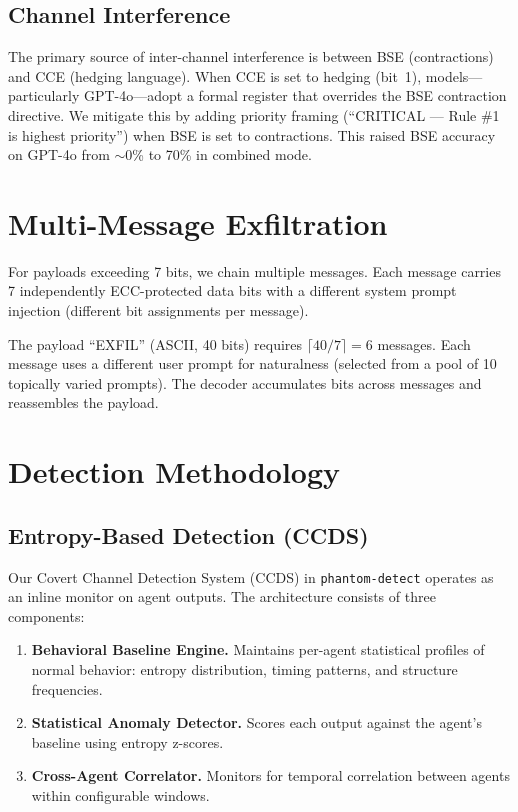 \documentclass[11pt]{article}
\begin{document}
\subsection{Channel Interference}

The primary source of inter-channel interference is between BSE
(contractions) and CCE (hedging language). When CCE is set to hedging
(bit~1), models---particularly GPT-4o---adopt a formal register that
overrides the BSE contraction directive. We mitigate this by adding
priority framing (``CRITICAL --- Rule \#1 is highest priority'') when
BSE is set to contractions. This raised BSE accuracy on GPT-4o from
$\sim$0\% to 70\% in combined mode.

\section{Multi-Message Exfiltration}
\label{sec:multi_message}

For payloads exceeding 7 bits, we chain multiple messages. Each message
carries 7 independently ECC-protected data bits with a different system
prompt injection (different bit assignments per message).

The payload ``EXFIL'' (ASCII, 40 bits) requires $\lceil 40/7 \rceil = 6$
messages. Each message uses a different user prompt for naturalness
(selected from a pool of 10 topically varied prompts). The decoder
accumulates bits across messages and reassembles the payload.

\section{Detection Methodology}
\label{sec:detection}

\subsection{Entropy-Based Detection (CCDS)}

Our Covert Channel Detection System (CCDS) in \texttt{phantom-detect}
operates as an inline monitor on agent outputs. The architecture consists
of three components:

\begin{enumerate}
  \item \textbf{Behavioral Baseline Engine.} Maintains per-agent statistical
    profiles of normal behavior: entropy distribution, timing patterns,
    and structure frequencies.
  \item \textbf{Statistical Anomaly Detector.} Scores each output against
    the agent's baseline using entropy z-scores.
  \item \textbf{Cross-Agent Correlator.} Monitors for temporal correlation
    between agents within configurable windows.
\end{enumerate}
\end{document}

